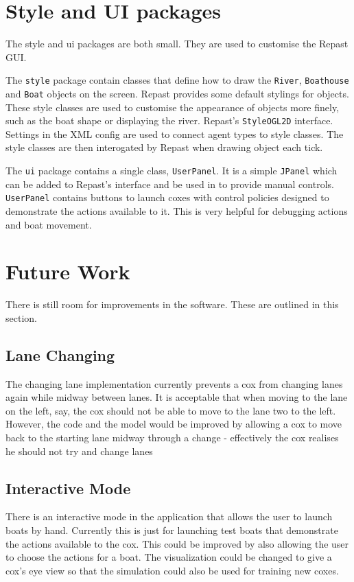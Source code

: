 {\section{Style and UI packages}
The style and ui packages are both small. They are used to customise the Repast
GUI. 

The \texttt{style} package contain classes
that define how to draw the \texttt{River}, \texttt{Boathouse} and \texttt{Boat} objects on the
screen. Repast provides some default stylings for objects. These style
classes are used to customise the appearance of objects more finely,
such as the boat shape or displaying the river.
Repast's \texttt{StyleOGL2D} interface. Settings in the XML config are used to
connect agent types to style classes. The style classes are then
interogated by Repast when drawing object each tick.

The \texttt{ui} package contains a single class, \texttt{UserPanel}. It is a simple \texttt{JPanel} which
can be added to Repast's interface and be used in to provide manual
controls. \texttt{UserPanel} contains buttons to launch coxes with control
policies designed to demonstrate the actions available to it. This is
very helpful for debugging actions and boat movement.

\section{Future Work}
There is still room for improvements in the software. These are outlined in this section.

\subsection{Lane Changing}
The changing lane implementation currently prevents a cox from changing lanes again while midway between lanes. It is acceptable that when moving to the lane on the left, say, the cox should not be able to move to the lane two to the left. However, the code and the model would be improved by allowing a cox to move back to the starting lane midway through a change - effectively the cox realises he should not try and change lanes

\subsection{Interactive Mode}
There is an interactive mode in the application that allows the user to launch boats by hand. Currently this is just for launching test boats that demonstrate the actions available to the cox. This could be improved by also allowing the user to choose the actions for a boat. The visualization could be changed to give a cox's eye view so that the simulation could also be used for training new coxes.

}

